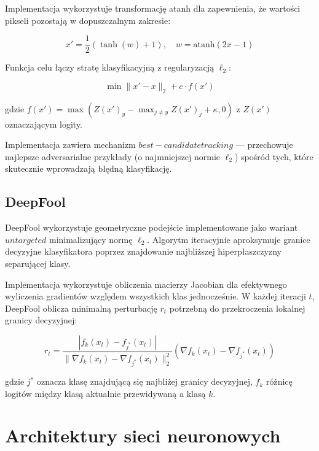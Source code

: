 \documentclass[12pt]{article}
\begin{document}
Implementacja wykorzystuje transformację atanh dla zapewnienia, że wartości pikseli pozostają w dopuszczalnym zakresie:

\begin{equation}
    x' = \frac{1}{2}(\tanh(w) + 1), \quad w = \text{atanh}(2x - 1)
\end{equation}

Funkcja celu łączy stratę klasyfikacyjną z regularyzacją $\ell_2$:

\begin{equation}
    \min \|x' - x\|_2 + c \cdot f(x')
\end{equation}

gdzie $f(x') = \max(Z(x')_{y} - \max_{j \neq y} Z(x')_j + \kappa, 0)$ z $Z(x')$ oznaczającym logity.

Implementacja zawiera mechanizm $best-candidate tracking$ --- przechowuje najlepsze adversarialne przykłady (o najmniejszej normie $\ell_2$) spośród tych, które skutecznie wprowadzają błędną klasyfikację.

\subsection{DeepFool}

DeepFool \supercite{moosavi2016deepfool} wykorzystuje geometryczne podejście implementowane jako wariant $untargeted$ minimalizujący normę $\ell_2$. Algorytm iteracyjnie aproksymuje granice decyzyjne klasyfikatora poprzez znajdowanie najbliższej hiperpłaszczyzny separującej klasy.

Implementacja wykorzystuje obliczenia macierzy Jacobian dla efektywnego wyliczenia gradientów względem wszystkich klas jednocześnie. W każdej iteracji $t$, DeepFool oblicza minimalną perturbację $r_t$ potrzebną do przekroczenia lokalnej granicy decyzyjnej:

\begin{equation}
    r_t = \frac{|f_k(x_t) - f_{j^*}(x_t)|}{\|\nabla f_k(x_t) - \nabla f_{j^*}(x_t)\|_2^2} (\nabla f_k(x_t) - \nabla f_{j^*}(x_t))
\end{equation}

gdzie $j^*$ oznacza klasę znajdującą się najbliżej granicy decyzyjnej, $f_k$ różnicę logitów między klasą aktualnie przewidywaną a klasą $k$.

\section{Architektury sieci neuronowych}
\end{document}
